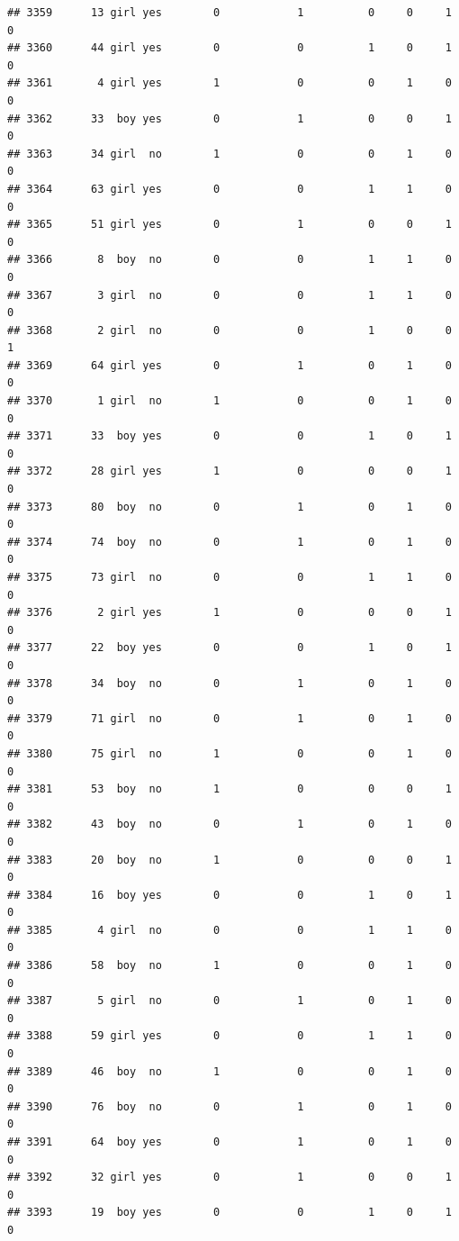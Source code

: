 \documentclass[man]{apa6}
\begin{document}
\begin{verbatim}
## 3359      13 girl yes        0            1          0     0     1     0
## 3360      44 girl yes        0            0          1     0     1     0
## 3361       4 girl yes        1            0          0     1     0     0
## 3362      33  boy yes        0            1          0     0     1     0
## 3363      34 girl  no        1            0          0     1     0     0
## 3364      63 girl yes        0            0          1     1     0     0
## 3365      51 girl yes        0            1          0     0     1     0
## 3366       8  boy  no        0            0          1     1     0     0
## 3367       3 girl  no        0            0          1     1     0     0
## 3368       2 girl  no        0            0          1     0     0     1
## 3369      64 girl yes        0            1          0     1     0     0
## 3370       1 girl  no        1            0          0     1     0     0
## 3371      33  boy yes        0            0          1     0     1     0
## 3372      28 girl yes        1            0          0     0     1     0
## 3373      80  boy  no        0            1          0     1     0     0
## 3374      74  boy  no        0            1          0     1     0     0
## 3375      73 girl  no        0            0          1     1     0     0
## 3376       2 girl yes        1            0          0     0     1     0
## 3377      22  boy yes        0            0          1     0     1     0
## 3378      34  boy  no        0            1          0     1     0     0
## 3379      71 girl  no        0            1          0     1     0     0
## 3380      75 girl  no        1            0          0     1     0     0
## 3381      53  boy  no        1            0          0     0     1     0
## 3382      43  boy  no        0            1          0     1     0     0
## 3383      20  boy  no        1            0          0     0     1     0
## 3384      16  boy yes        0            0          1     0     1     0
## 3385       4 girl  no        0            0          1     1     0     0
## 3386      58  boy  no        1            0          0     1     0     0
## 3387       5 girl  no        0            1          0     1     0     0
## 3388      59 girl yes        0            0          1     1     0     0
## 3389      46  boy  no        1            0          0     1     0     0
## 3390      76  boy  no        0            1          0     1     0     0
## 3391      64  boy yes        0            1          0     1     0     0
## 3392      32 girl yes        0            1          0     0     1     0
## 3393      19  boy yes        0            0          1     0     1     0

\end{verbatim}
\end{document}
